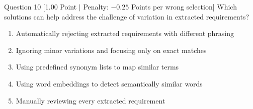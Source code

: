 \documentclass[11pt,a4paper]{article}
\begin{document}
\begin{questionbox}{Question 10 \hfill [1.00 Point $\vert$ Penalty: $-0.25$ Points per wrong selection]}
Which solutions can help address the challenge of variation in extracted requirements?
\begin{enumerate}[label=\alph*.,leftmargin=2em]
    \item Automatically rejecting extracted requirements with different phrasing
    \item Ignoring minor variations and focusing only on exact matches
    \item Using predefined synonym lists to map similar terms
    \item Using word embeddings to detect semantically similar words
    \item Manually reviewing every extracted requirement
\end{enumerate}
\end{questionbox}
\end{document}
